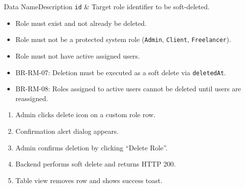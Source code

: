 
\begin{specdatatable}{Data Name}{Description}
\texttt{id} & Target role identifier to be soft-deleted.\\ \hline
\end{specdatatable}

\begin{itemize}[leftmargin=1.6em,topsep=3pt,itemsep=2pt,parsep=0pt,label=$\bullet$]
    \item Role must exist and not already be deleted.
    \item Role must not be a protected system role (\texttt{Admin}, \texttt{Client}, \texttt{Freelancer}).
    \item Role must not have active assigned users.
\end{itemize}

\begin{itemize}[leftmargin=1.6em,topsep=3pt,itemsep=2pt,parsep=0pt,label=$\bullet$]\brrulelist
    \item BR-RM-07: Deletion must be executed as a soft delete via \texttt{deletedAt}.
    \item BR-RM-08: Roles assigned to active users cannot be deleted until users are reassigned.
\end{itemize}

\begin{enumerate}[leftmargin=1.8em,topsep=3pt,itemsep=2pt,parsep=0pt]
    \item Admin clicks delete icon on a custom role row.
    \item Confirmation alert dialog appears.
    \item Admin confirms deletion by clicking ``Delete Role''.
    \item Backend performs soft delete and returns HTTP 200.
    \item Table view removes row and shows success toast.
\end{enumerate}

